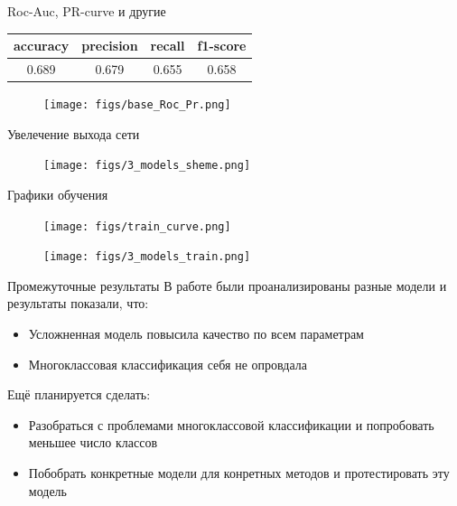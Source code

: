 \documentclass[aspectratio=169]{beamer}
\begin{document}
\begin{frame}{Roc-Auc, PR-curve и другие}
\begin{center}
\begin{tabular}{|c|c|c|c|}
\toprule
\hline
accuracy & precision & recall & f1-score \\
\hline
0.689 & 0.679 & 0.655 & 0.658 \\
\hline
\bottomrule
\end{tabular}
\end{center}
\begin{figure}
\centering
\texttt{[image: figs/base\_Roc\_Pr.png]}
\end{figure}
\end{frame}
\begin{frame}{Увелечение выхода сети}
\begin{figure}
\centering
\texttt{[image: figs/3\_models\_sheme.png]}
\end{figure}
\end{frame}
\begin{frame}{Графики обучения}
\begin{figure}
\centering
\texttt{[image: figs/train\_curve.png]}
\end{figure}

\begin{figure}
\centering
\texttt{[image: figs/3\_models\_train.png]}
\end{figure}

\end{frame}
\begin{frame}{Промежуточные результаты}
В работе были проанализированы разные модели и результаты показали, что:
\begin{itemize}
    \item Усложненная модель повысила качество по всем параметрам
    \item Многоклассовая классификация себя не опровдала
\end{itemize}
Ещё планируется сделать:
\begin{itemize}
    \item Разобраться с проблемами многоклассовой классификации и попробовать меньшее число классов
    \item Побобрать конкретные модели для конретных методов и протестировать эту модель
\end{itemize}
\end{frame}
\end{document}
